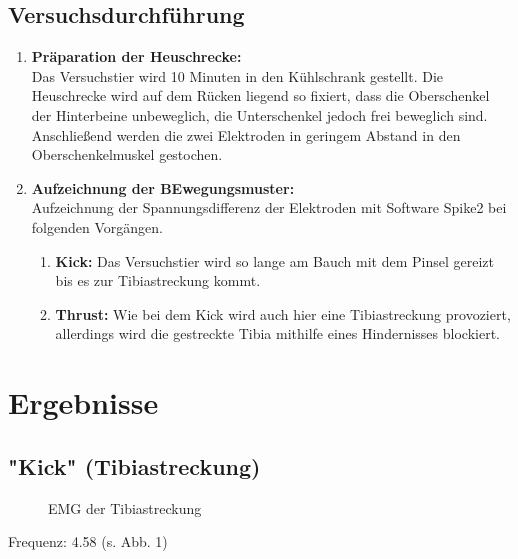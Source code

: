 \subsection{Versuchsdurchführung}
\begin{enumerate}
\item \textbf{Präparation der Heuschrecke:}\\ Das Versuchstier wird 10 Minuten in den Kühlschrank gestellt. Die Heuschrecke wird auf dem Rücken liegend so fixiert, dass die Oberschenkel der Hinterbeine unbeweglich, die Unterschenkel jedoch frei beweglich sind. Anschließend werden die zwei Elektroden in geringem Abstand in den Oberschenkelmuskel gestochen. 
\item \textbf{Aufzeichnung der BEwegungsmuster:}\\
Aufzeichnung der Spannungsdifferenz der Elektroden mit Software Spike2 bei folgenden Vorgängen.
\begin{enumerate}
\item \textbf{Kick:} Das Versuchstier wird so lange am Bauch mit dem Pinsel gereizt bis es zur Tibiastreckung kommt. 
\item \textbf{Thrust:} Wie bei dem Kick wird auch hier eine Tibiastreckung provoziert, allerdings wird die gestreckte Tibia mithilfe eines Hindernisses blockiert. 
\end{enumerate}
\end{enumerate}

\section{Ergebnisse}
\subsection{"{}Kick"{} (Tibiastreckung)}
\begin{figure}[H]
\caption{EMG der Tibiastreckung}
\label{kick}
\end{figure}
Frequenz: 4.58 (s. Abb. 1)

